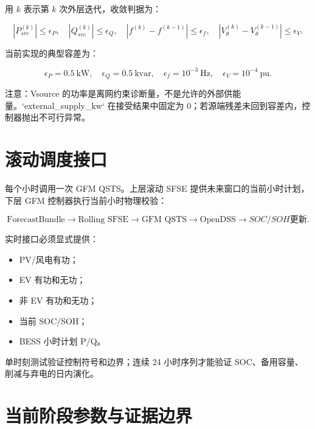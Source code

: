 \documentclass[UTF8,a4paper,11pt]{ctexart}
\begin{document}
用 $k$ 表示第 $k$ 次外层迭代，收敛判据为：

\begin{equation}
|P_{src}^{(k)}|\leq\epsilon_P,
\quad
|Q_{src}^{(k)}|\leq\epsilon_Q,
\quad
|f^{(k)}-f^{(k-1)}|\leq\epsilon_f,
\quad
|V_{\theta}^{(k)}-V_{\theta}^{(k-1)}|\leq\epsilon_V.
\end{equation}

当前实现的典型容差为：

\begin{equation}
\epsilon_P=0.5\ \text{kW},\quad
\epsilon_Q=0.5\ \text{kvar},\quad
\epsilon_f=10^{-3}\ \text{Hz},\quad
\epsilon_V=10^{-4}\ \text{pu}.
\end{equation}

注意：Vsource 的功率是离网约束诊断量，不是允许的外部供能量。`external_supply_kw` 在接受结果中固定为 0；若源端残差未回到容差内，控制器抛出不可行异常。

\section{滚动调度接口}

每个小时调用一次 GFM QSTS。上层滚动 SFSE 提供未来窗口的当前小时计划，下层 GFM 控制器执行当前小时物理校验：

\begin{equation}
\text{ForecastBundle}
\rightarrow
\text{Rolling SFSE}
\rightarrow
\text{GFM QSTS}
\rightarrow
\text{OpenDSS}
\rightarrow
SOC/SOH 更新.
\end{equation}

实时接口必须显式提供：

\begin{itemize}
  \item PV/风电有功；
  \item EV 有功和无功；
  \item 非 EV 有功和无功；
  \item 当前 SOC/SOH；
  \item BESS 小时计划 P/Q。
\end{itemize}

单时刻测试验证控制符号和边界；连续 24 小时序列才能验证 SOC、备用容量、削减与弃电的日内演化。

\section{当前阶段参数与证据边界}
\end{document}
